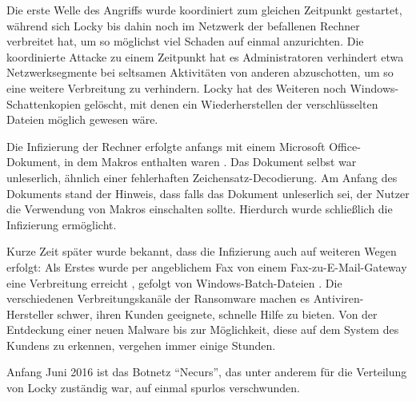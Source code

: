 Die erste Welle des Angriffs wurde koordiniert zum gleichen Zeitpunkt gestartet, während sich Locky bis dahin noch im Netzwerk der befallenen Rechner verbreitet hat, um so möglichst viel Schaden auf einmal anzurichten. Die koordinierte Attacke zu einem Zeitpunkt hat es Administratoren verhindert etwa Netzwerksegmente bei seltsamen Aktivitäten von anderen abzuschotten, um so eine weitere Verbreitung zu verhindern. Locky hat des Weiteren noch Windows-Schattenkopien gelöscht, mit denen ein Wiederherstellen der verschlüsselten Dateien möglich gewesen wäre.\dcn

Die Infizierung der Rechner erfolgte anfangs mit einem Microsoft Office-Dokument, in dem Makros enthalten waren \cite{locky:infection}. Das Dokument selbst war unleserlich, ähnlich einer fehlerhaften Zeichensatz-Decodierung. Am Anfang des Dokuments stand der Hinweis, dass falls das Dokument unleserlich sei, der Nutzer die Verwendung von Makros einschalten sollte. Hierdurch wurde schließlich die Infizierung ermöglicht.

Kurze Zeit später wurde bekannt, dass die Infizierung auch auf weiteren Wegen erfolgt: Als Erstes wurde per angeblichem Fax von einem Fax-zu-E-Mail-Gateway eine Verbreitung erreicht \cite{locky:fax}, gefolgt von Windows-Batch-Dateien \cite{locky:batch}. Die verschiedenen Verbreitungskanäle der Ransomware machen es Antiviren-Hersteller schwer, ihren Kunden geeignete, schnelle Hilfe zu bieten. Von der Entdeckung einer neuen Malware bis zur Möglichkeit, diese auf dem System des Kundens zu erkennen, vergehen immer einige Stunden.\dcn

Anfang Juni 2016 ist das Botnetz ``Necurs'', das unter anderem für die Verteilung von Locky zuständig war, auf einmal spurlos verschwunden. \cite{locky:end}

		

